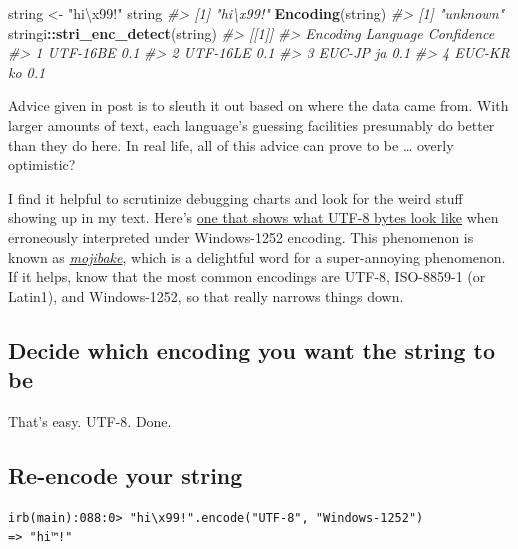 \documentclass[
]{book}
\newenvironment{Shaded}{\begin{snugshade}}{\end{snugshade}}
\newcommand{\CharTok}[1]{\textcolor[rgb]{0.31,0.60,0.02}{#1}}
\newcommand{\CommentTok}[1]{\textcolor[rgb]{0.56,0.35,0.01}{\textit{#1}}}
\newcommand{\KeywordTok}[1]{\textcolor[rgb]{0.13,0.29,0.53}{\textbf{#1}}}
\newcommand{\NormalTok}[1]{#1}
\newcommand{\OperatorTok}[1]{\textcolor[rgb]{0.81,0.36,0.00}{\textbf{#1}}}
\newcommand{\StringTok}[1]{\textcolor[rgb]{0.31,0.60,0.02}{#1}}
\begin{document}
\begin{Shaded}
\begin{Highlighting}[]
\NormalTok{string <-}\StringTok{ "hi}\CharTok{\textbackslash{}x99}\StringTok{!"}
\NormalTok{string}
\CommentTok{#> [1] "hi\textbackslash{}x99!"}
\KeywordTok{Encoding}\NormalTok{(string)}
\CommentTok{#> [1] "unknown"}
\NormalTok{stringi}\OperatorTok{::}\KeywordTok{stri_enc_detect}\NormalTok{(string)}
\CommentTok{#> [[1]]}
\CommentTok{#>   Encoding Language Confidence}
\CommentTok{#> 1 UTF-16BE                 0.1}
\CommentTok{#> 2 UTF-16LE                 0.1}
\CommentTok{#> 3   EUC-JP       ja        0.1}
\CommentTok{#> 4   EUC-KR       ko        0.1}
\end{Highlighting}
\end{Shaded}

Advice given in post is to sleuth it out based on where the data came from. With larger amounts of text, each language's guessing facilities presumably do better than they do here. In real life, all of this advice can prove to be \ldots{} overly optimistic?

I find it helpful to scrutinize debugging charts and look for the weird stuff showing up in my text. Here's \href{http://www.i18nqa.com/debug/utf8-debug.html}{one that shows what UTF-8 bytes look like} when erroneously interpreted under Windows-1252 encoding. This phenomenon is known as \href{https://en.wikipedia.org/wiki/Mojibake}{\emph{mojibake}}, which is a delightful word for a super-annoying phenomenon. If it helps, know that the most common encodings are UTF-8, ISO-8859-1 (or Latin1), and Windows-1252, so that really narrows things down.

\hypertarget{decide-which-encoding-you-want-the-string-to-be}{%
\subsection{Decide which encoding you want the string to be}\label{decide-which-encoding-you-want-the-string-to-be}}

That's easy. UTF-8. Done.

\hypertarget{re-encode-your-string}{%
\subsection{Re-encode your string}\label{re-encode-your-string}}

\begin{verbatim}
irb(main):088:0> "hi\x99!".encode("UTF-8", "Windows-1252")
=> "hi™!"
\end{verbatim}
\end{document}

